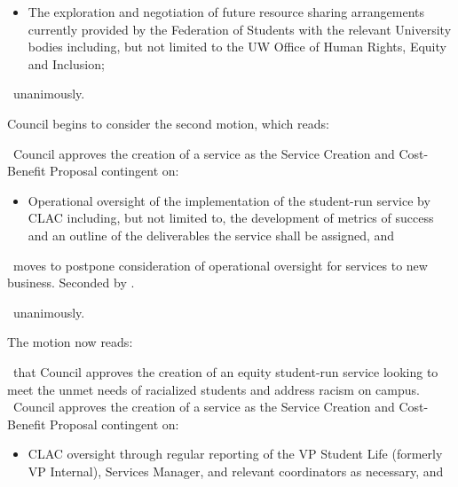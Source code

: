 \begin{motion}
\begin{motion}
\begin{motion}
\begin{itemize}
                \item The exploration and negotiation of future resource sharing
                    arrangements currently provided by the Federation of Students with
                    the relevant University bodies including, but not limited to the UW
                    Office of Human Rights, Equity and Inclusion;

            \end{itemize}
        \end{motion}

        \carries\ unanimously.

        Council begins to consider the second motion, which reads:
        \begin{motion}
            \birt\ Council approves the creation of a service as the Service Creation
            and Cost-Benefit Proposal contingent on:
            \begin{itemize}
                \item Operational oversight of the implementation of the
                    student-run service by CLAC including, but not limited to, the
                    development of metrics of success and an outline of the
                    deliverables the service shall be assigned, and
            \end{itemize}
        \end{motion}
        \seneca\ moves to postpone consideration of operational oversight for
        services to new business. Seconded by \katie. 

        \carries\ unanimously.

    \end{motion}

    The motion now reads:
    \begin{motion}

        \birt\ that Council approves the creation of an equity student-run
        service looking to meet the unmet needs of racialized students and
        address racism on campus.
        \bifrt\ Council approves the creation of a service as the Service
        Creation and Cost-Benefit Proposal contingent on:

        \begin{itemize}
            \item CLAC oversight through regular reporting of the VP Student
                Life (formerly VP Internal), Services Manager, and relevant
                coordinators as necessary, and 


\end{itemize}
\end{motion}
\end{motion}
